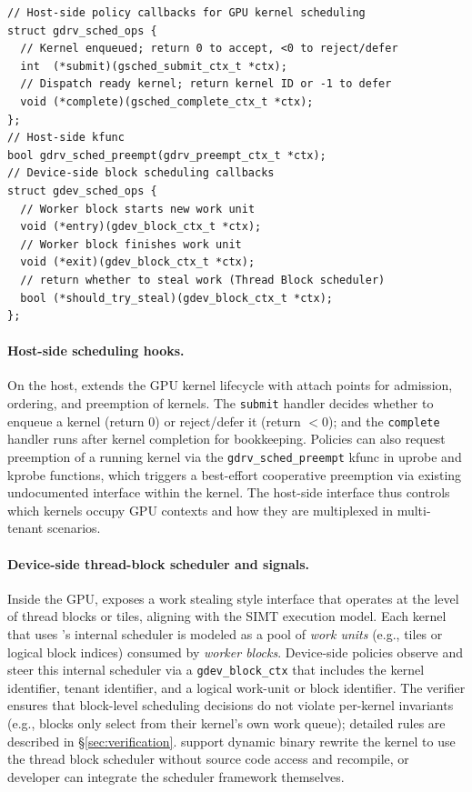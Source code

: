 \begin{verbatim}
// Host-side policy callbacks for GPU kernel scheduling
struct gdrv_sched_ops {
  // Kernel enqueued; return 0 to accept, <0 to reject/defer
  int  (*submit)(gsched_submit_ctx_t *ctx);
  // Dispatch ready kernel; return kernel ID or -1 to defer
  void (*complete)(gsched_complete_ctx_t *ctx);
};
// Host-side kfunc
bool gdrv_sched_preempt(gdrv_preempt_ctx_t *ctx);
// Device-side block scheduling callbacks
struct gdev_sched_ops {
  // Worker block starts new work unit
  void (*entry)(gdev_block_ctx_t *ctx);
  // Worker block finishes work unit
  void (*exit)(gdev_block_ctx_t *ctx);
  // return whether to steal work (Thread Block scheduler)
  bool (*should_try_steal)(gdev_block_ctx_t *ctx);
};
\end{verbatim}

\paragraph{Host-side scheduling hooks.}
On the host, \sys extends the GPU kernel lifecycle with attach points for admission, ordering, and preemption of kernels. The \texttt{submit} handler decides whether to enqueue a kernel (return 0) or reject/defer it (return $<$0); and the \texttt{complete} handler runs after kernel completion for bookkeeping. Policies can also request preemption of a running kernel via the \texttt{gdrv\_sched\_preempt} kfunc in uprobe and kprobe functions, which triggers a best-effort cooperative preemption via existing undocumented\cite{gpreempt} interface within the kernel. The host-side interface thus controls which kernels occupy GPU contexts and how they are multiplexed in multi-tenant scenarios.


\paragraph{Device-side thread-block scheduler and signals.} Inside the GPU, \sys exposes a work stealing style interface that operates at the level of thread blocks or tiles, aligning with the SIMT execution model. Each kernel that uses \sys's internal scheduler is modeled as a pool of \emph{work units} (e.g., tiles or logical block indices) consumed by \emph{worker blocks}. Device-side policies observe and steer this internal scheduler via a \texttt{gdev\_block\_ctx} that includes the kernel identifier, tenant identifier, and a logical work-unit or block identifier. The verifier ensures that block-level scheduling decisions do not violate per-kernel invariants (e.g., blocks only select from their kernel's own work queue); detailed rules are described in \S\ref{sec:verification}. \sys support dynamic binary rewrite the kernel to use the thread block scheduler without source code access and recompile, or developer can integrate the scheduler framework themselves.


